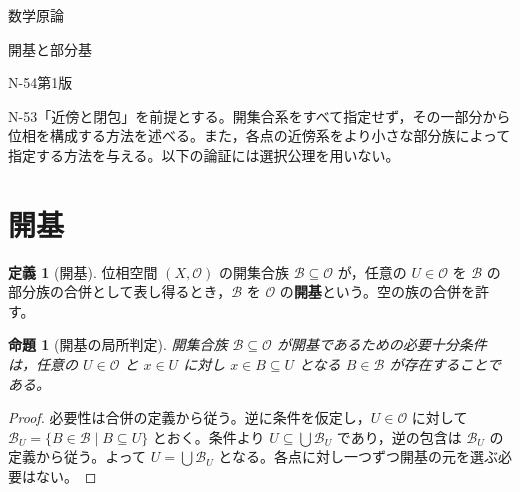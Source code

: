 \documentclass[a5paper,10pt,dvipdfmx]{jsarticle}
\theoremstyle{definition}
\newtheorem{defn}[ruledef]{定義}
\theoremstyle{plain}
\newtheorem{prop}[ruledef]{命題}
\begin{document}
\begin{center}
{\small 数学原論}\par\vspace{4mm}
{\LARGE 開基と部分基}\par\vspace{2mm}
{\small N-54\quad 第1版}
\end{center}
N-53「近傍と閉包」を前提とする。開集合系をすべて指定せず，その一部分から位相を構成する方法を述べる。また，各点の近傍系をより小さな部分族によって指定する方法を与える。以下の論証には選択公理を用いない。
\section{開基}
\begin{defn}[開基]\label{k208}
位相空間 $(X,\mathcal O)$ の開集合族 $\mathcal B\subseteq\mathcal O$ が，任意の $U\in\mathcal O$ を $\mathcal B$ の部分族の合併として表し得るとき，$\mathcal B$ を $\mathcal O$ の\textbf{開基}という。空の族の合併を許す。
\end{defn}
\begin{prop}[開基の局所判定]\label{k209}
開集合族 $\mathcal B\subseteq\mathcal O$ が開基であるための必要十分条件は，任意の $U\in\mathcal O$ と $x\in U$ に対し $x\in B\subseteq U$ となる $B\in\mathcal B$ が存在することである。
\end{prop}
\begin{proof}
必要性は合併の定義から従う。逆に条件を仮定し，$U\in\mathcal O$ に対して $\mathcal B_U=\{B\in\mathcal B\mid B\subseteq U\}$ とおく。条件より $U\subseteq\bigcup\mathcal B_U$ であり，逆の包含は $\mathcal B_U$ の定義から従う。よって $U=\bigcup\mathcal B_U$ となる。各点に対し一つずつ開基の元を選ぶ必要はない。
\end{proof}
\end{document}
